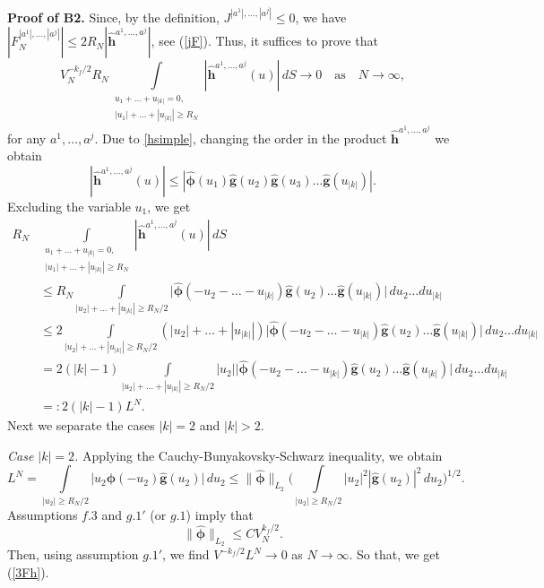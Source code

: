 \documentclass{article}
\numberwithin{equation}{section}
\newcommand{\ra}{\rightarrow}
\newcommand{\ili}{\int\limits}
\newcommand{\lbl}{\label}
\newcommand{\ass}{\quad\mbox{as}\quad}
\newcommand{\bee}{\begin{equation}}
\newcommand{\eee}{\end{equation}}
\newcommand{\non}{\nonumber}
\newcommand{\sck}{\substack}
\begin{document}
{\bf Proof of B2.}
Since, by the definition,
$J^{|a^1|,\ldots, |a^j|}\leq 0$,
we have
$|F_N^{|a^1|,\ldots, |a^j|}|\leq 2R_N |\hat {\bm h}^{a^1,\ldots,a^j}|$,
see (\ref{jF}).
Thus, it suffices to prove that
\bee\lbl{3Fh}
V_N^{-k_f/2}
R_N\ili_{\sck{u_1+\ldots+ u_{|k|}=0,\\ |u_1|+\ldots+|u_{|k|}|\geq R_N}}
|\hat {\bm h}^{a^1,\ldots,a^j}(u)| \, dS \ra 0 \ass N\ra\infty,
\eee
for any $a^1,\ldots,a^j$.
Due to \eqref{hsimple},
changing the order in the product 
$\hat {\bm h}^{a^1,\ldots,a^j}$
we obtain
$$
|\hat {\bm h}^{a^1,\ldots,a^j}(u)|
	\leq	|\hat {\bm \phi}(u_1)\hat {\bm g}(u_2)\hat {\bm g}(u_3)\ldots\hat {\bm g}(u_{|k|})|.
$$
Excluding the variable $u_1$, we get
\begin{align}\non
R_N&\ili_{\sck{u_1+\ldots+ u_{|k|}=0,\\ |u_1|+\ldots+|u_{|k|}|\geq R_N}}
|\hat {\bm h}^{a^1,\ldots,a^j}(u)| \, dS
	\\\non
	&\leq
		R_N
		\ili_{|u_2|+\ldots+|u_{|k|}|\geq R_N/2}
		\big|\hat {\bm \phi}(-u_2-\ldots-u_{|k|})\hat {\bm g}(u_2)\ldots\hat {\bm g}(u_{|k|})\big|
		\,du_2\ldots du_{|k|}
\\\non
	&\leq
		2\ili_{|u_2|+\ldots+|u_{|k|}|\geq R_N/2} (|u_2|+\ldots+|u_{|k|}|)
		\big|\hat {\bm \phi}(-u_2-\ldots-u_{|k|})\hat {\bm g}(u_2)\ldots\hat {\bm g}(u_{|k|})\big|
		\,du_2\ldots du_{|k|}
\\\non
	&=2(|k|-1)\ili_{|u_2|+\ldots+|u_{|k|}|\geq R_N/2} |u_2|
		\big|\hat {\bm \phi}(-u_2-\ldots-u_{|k|})
	\hat {\bm g}(u_2)\ldots\hat {\bm g}(u_{|k|})\big|
		\,du_2\ldots du_{|k|}
\\\non
	&=:2(|k|-1) L^N.
\end{align}
Next we separate the cases
$|k|=2$ and $|k|>2$.

{\it Case $|k|=2$.}
Applying the  Cauchy-Bunyakovsky-Schwarz inequality, we obtain
\bee\non
L^N=\ili_{|u_2|\geq R_N/2}
		\big|u_2\hat{\bm \phi}(-u_2)\hat{\bm g}(u_2)\big| \, du_2
	\leq
		\|\hat{\bm \phi}\|_{L_2}\Big(\ili_{|u_2|\geq R_N/2}|u_2|^2|\hat{\bm g}(u_2)|^2\, du_2\Big)^{1/2}.
\eee
Assumptions $f.3$ and $g.1'$ (or $g.1$) imply that
\bee\lbl{phil2}
\|\hat{\bm \phi}\|_{L_2}\leq C V_N^{k_f/2}.
\eee
Then, using assumption $g.1'$, we find
$V^{-k_f/2}L^N\ra 0$ as $N\ra\infty$.
So that, we get (\ref{3Fh}).
\end{document}
